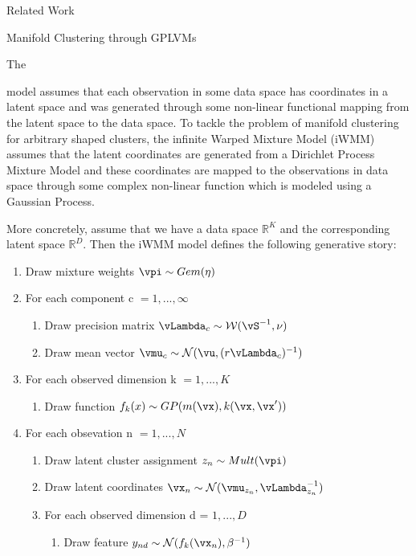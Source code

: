 \documentclass{article}
\begin{document}
\begin{psection}{Related Work}
\begin{psubsection}{Manifold Clustering through GPLVMs}

	\hypertarget{subsec:2.4}{The} model assumes that each observation in some data space has coordinates in a latent space and was generated through some non-linear functional mapping from the latent space to the data space. To tackle the problem of manifold clustering for arbitrary shaped clusters, the infinite Warped Mixture Model (iWMM) \citep{gplvm} assumes that the latent coordinates are generated from a Dirichlet Process Mixture Model and these coordinates are mapped to the observations in data space through some complex non-linear function which is modeled using a Gaussian Process.

	More concretely, assume that we have a data space $\mathbb{R}^K$ and the corresponding latent space $\mathbb{R}^D$. Then the iWMM model defines the following generative story:

	\begin{enumerate}
		\item Draw mixture weights $\vpi \sim Gem(\eta)$
		\item {For each component  c $= 1,...,\infty$
				\begin{enumerate}
					\item Draw precision matrix $\vLambda_c \sim \mathcal{W}(\vS^{-1}, \nu)$
					\item Draw mean vector $\vmu_c \sim \mathcal{N}(\vu, (r\vLambda_c)^{-1})$
			\end{enumerate}}
		\item {For each observed dimension k $=1,...,K$
				\begin{enumerate}
					\item Draw function $f_k(x) \sim GP(m(\vx),k(\vx,\vx'))$
			\end{enumerate}}
		\item For each obsevation n $= 1,...,N$
				\begin{enumerate}
					\item Draw latent cluster assignment $z_n \sim Mult(\vpi)$
					\item Draw latent coordinates $\vx_n \sim \mathcal{N}(\vmu_{z_n},\vLambda_{z_n}^{-1})$
					\item For each observed dimension d = $1,...,D$
						\begin{enumerate}
							\item Draw feature $y_{nd} \sim \mathcal{N}(f_k(\vx_n),\beta^{-1})$
						\end{enumerate}
			\end{enumerate}
	\end{enumerate}


\end{psubsection}
\end{psection}
\end{document}
